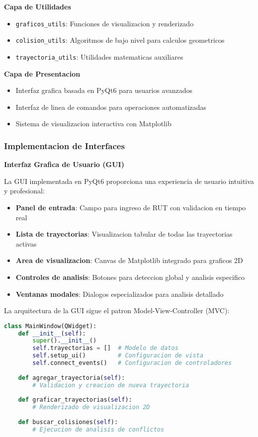 \documentclass[12pt,a4paper]{article}
\begin{document}
\textbf{Capa de Utilidades}
\begin{itemize}
    \item \texttt{graficos\_utils}: Funciones de visualizacion y renderizado
    \item \texttt{colision\_utils}: Algoritmos de bajo nivel para calculos geometricos
    \item \texttt{trayectoria\_utils}: Utilidades matematicas auxiliares
\end{itemize}

\textbf{Capa de Presentacion}
\begin{itemize}
    \item Interfaz grafica basada en PyQt6 para usuarios avanzados
    \item Interfaz de linea de comandos para operaciones automatizadas
    \item Sistema de visualizacion interactiva con Matplotlib
\end{itemize}

\subsubsection{Implementacion de Interfaces}

\textbf{Interfaz Grafica de Usuario (GUI)}

La GUI implementada en PyQt6 proporciona una experiencia de usuario intuitiva y profesional:

\begin{itemize}
    \item \textbf{Panel de entrada}: Campo para ingreso de RUT con validacion en tiempo real
    \item \textbf{Lista de trayectorias}: Visualizacion tabular de todas las trayectorias activas
    \item \textbf{Area de visualizacion}: Canvas de Matplotlib integrado para graficos 2D
    \item \textbf{Controles de analisis}: Botones para deteccion global y analisis especifico
    \item \textbf{Ventanas modales}: Dialogos especializados para analisis detallado
\end{itemize}

La arquitectura de la GUI sigue el patron Model-View-Controller (MVC):

\begin{lstlisting}[language=Python, caption=Estructura principal de la GUI]
class MainWindow(QWidget):
    def __init__(self):
        super().__init__()
        self.trayectorias = []  # Modelo de datos
        self.setup_ui()         # Configuracion de vista
        self.connect_events()   # Configuracion de controladores
    
    def agregar_trayectoria(self):
        # Validacion y creacion de nueva trayectoria
        
    def graficar_trayectorias(self):
        # Renderizado de visualizacion 2D
        
    def buscar_colisiones(self):
        # Ejecucion de analisis de conflictos
\end{lstlisting}
\end{document}
